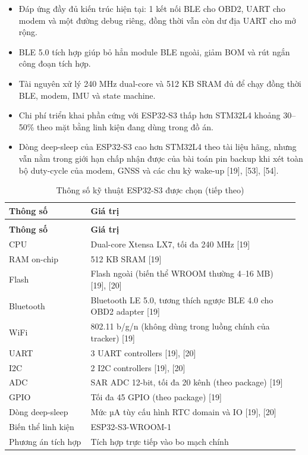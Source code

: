 \documentclass[a4paper]{extarticle}
\newcommand{\thesissettableid}[2]{%
  \renewcommand{\thetable}{#1}%
  \renewcommand{\theHtable}{#2}%
}
\providecommand{\tightlist}{%
  \setlength{\itemsep}{0pt}\setlength{\parskip}{0pt}}
\begin{document}
\begin{itemize}
\tightlist
\item
  Đáp ứng đầy đủ kiến trúc hiện tại: 1 kết nối BLE cho OBD2, UART cho
  modem và một đường debug riêng, đồng thời vẫn còn dư địa UART cho mở
  rộng.
\item
  BLE 5.0 tích hợp giúp bỏ hẳn module BLE ngoài, giảm BOM và rút ngắn
  công đoạn tích hợp.
\item
  Tài nguyên xử lý 240 MHz dual-core và 512 KB SRAM đủ để chạy đồng thời
  BLE, modem, IMU và state machine.
\item
  Chi phí triển khai phần cứng với ESP32-S3 thấp hơn STM32L4 khoảng
  30--50\% theo mặt bằng linh kiện đang dùng trong đồ án.
\item
  Dòng deep-sleep của ESP32-S3 cao hơn STM32L4 theo tài liệu hãng, nhưng
  vẫn nằm trong giới hạn chấp nhận được của bài toán pin backup khi xét
  toàn bộ duty-cycle của modem, GNSS và các chu kỳ wake-up {[}19{]},
  {[}53{]}, {[}54{]}.
\end{itemize}


{\thesissettableid{3.2}{tab-ch3-thong-so-ky-thuat-esp32-s3-uoc-chon}
\def\LTcaptype{table}
\begin{longtable}{|L{0.274\linewidth}|L{0.694\linewidth}|}
\caption{Thông số kỹ thuật ESP32-S3 được chọn}\label{tab:ch3-thong-so-ky-thuat-esp32-s3-uoc-chon}\\
\hline \textbf{Thông số} & \textbf{Giá trị} \\
\hline
\endfirsthead
\caption[]{Thông số kỹ thuật ESP32-S3 được chọn (tiếp theo)}\\
\hline \textbf{Thông số} & \textbf{Giá trị} \\
\hline
\endhead
\hline
\endfoot
\endlastfoot
CPU & Dual-core Xtensa LX7, tối đa 240 MHz {[}19{]} \\\hline
RAM on-chip & 512 KB SRAM {[}19{]} \\\hline
Flash & Flash ngoài (biến thể WROOM thường 4--16 MB) {[}19{]},
{[}20{]} \\\hline
Bluetooth & Bluetooth LE 5.0, tương thích ngược BLE 4.0 cho OBD2 adapter
{[}19{]} \\\hline
WiFi & 802.11 b/g/n (không dùng trong luồng chính của tracker)
{[}19{]} \\\hline
UART & 3 UART controllers {[}19{]}, {[}20{]} \\\hline
I2C & 2 I2C controllers {[}19{]}, {[}20{]} \\\hline
ADC & SAR ADC 12-bit, tối đa 20 kênh (theo package) {[}19{]} \\\hline
GPIO & Tối đa 45 GPIO (theo package) {[}19{]} \\\hline
Dòng deep-sleep & Mức µA tùy cấu hình RTC domain và IO {[}19{]},
{[}20{]} \\\hline
Biến thể linh kiện & ESP32-S3-WROOM-1 \\\hline
Phương án tích hợp & Tích hợp trực tiếp vào bo mạch chính \\\hline
\end{longtable}
}
\end{document}
